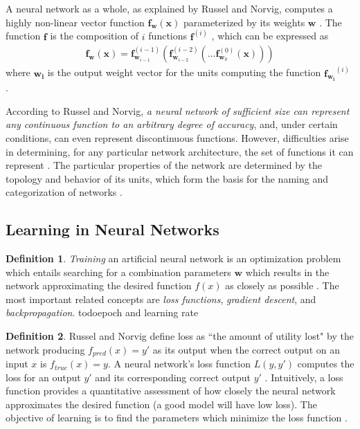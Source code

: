\documentclass[12pt, titlepage]{report}
\theoremstyle{definition}
\newtheorem{definition}{Definition}
\begin{document}
A neural network as a whole, as explained by Russel and Norvig, computes a highly non-linear vector function $\bm{f}_{\bm{w}}(\bm{x})$ parameterized by its weights $\bm{w}$ \cite[p. 731, 732]{russel2009artificial}. The function $\bm{f}$ is the composition of $i$ functions $\bm{f}^{(i)}$ \cite[p. 164]{goodfellow2016deep}, which can be expressed as
 \begin{gather}\label{eq:neural_net_composition}
 \bm{f_w}(\bm{x}) = \bm{f}_{\bm{w}_{i-1}}^{(i-1)} (\bm{f}_{\bm{w}_{i-2}}^{(i-2)} ( \ldots \bm{f}_{\bm{w}_{0}}^{(0)}(\bm{x})))
\end{gather}
where $\bm{w_i}$ is the output weight vector for the units computing the function $\bm{f_{w_i}}^{(i)}$ \cite{goodfellow2016deep}.

According to Russel and Norvig, \emph{a neural network of sufficient size can represent any continuous function to an arbitrary degree of accuracy}, and, under certain conditions, can even represent discontinuous functions. However, difficulties arise in determining, for any particular network architecture, the set of functions it can represent \cite[p. 732]{russel2009artificial}. The particular properties of the network are determined by the topology and behavior of its units, which form the basis for the naming and categorization of networks \cite[p. 729]{russel2009artificial}. 


\subsection{Learning in Neural Networks}
\begin{definition}
\emph{Training} an artificial neural network is an optimization problem which entails searching for a combination parameters $\bm{w}$ which results in the network approximating the desired function $f(x)$ as closely as possible \cite[p. 718]{russel2009artificial}. The most important related concepts are \emph{loss functions}, \emph{gradient descent}, and \emph{backpropagation}. todo{epoch and learning rate}
\end{definition}

\begin{definition}
Russel and Norvig define loss as ``the amount of utility lost" by the network producing $f_{pred}(x) = y'$ as its output when the correct output on an input $x$ is $f_{true}(x) = y$. A neural network's loss function $L(y, y')$ computes the loss for an output $y'$ and its corresponding correct output $y'$ \cite{russel2009artificial}. Intuitively, a loss function provides a quantitative assessment of how closely the neural network approximates the desired function (a good model will have low loss). The objective of learning is to find the parameters which minimize the loss function \cite[Linear classification: Support Vector Machine, Softmax]{karpathy2017cs231n}.
\end{definition}
\end{document}
